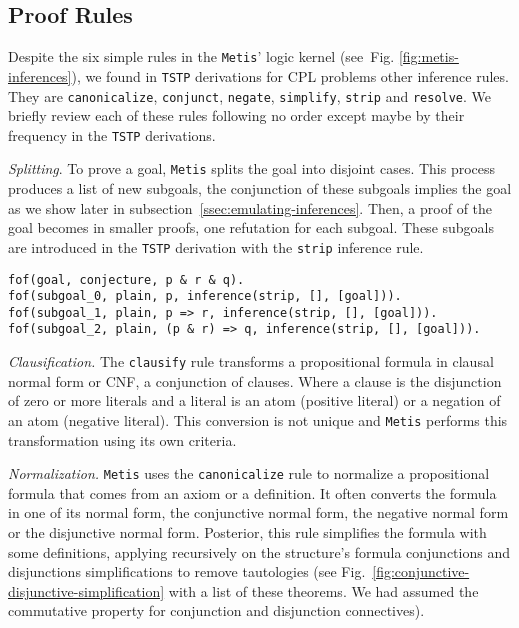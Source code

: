 \documentclass[../main.tex]{subfiles}
\begin{document}

\subsection{Proof Rules}
\label{ssec:proof-rules}

Despite the six simple rules in the \verb!Metis!' logic
kernel (see~Fig. \ref{fig:metis-inferences}), we found in \verb!TSTP!
derivations for CPL problems other inference rules.
They are \verb!canonicalize!, \verb!conjunct!, \verb!negate!, \verb!simplify!,
\verb!strip! and \verb!resolve!. We briefly review each of these rules
following no order except maybe by their frequency in the \verb!TSTP! derivations.


\textit{Splitting}.
To prove a goal, \verb!Metis! splits the goal into disjoint cases. This
process produces a list of new subgoals, the conjunction of these subgoals
implies the goal as we show later in subsection~\ref{ssec:emulating-inferences}.
Then, a proof of the goal becomes in smaller proofs, one
refutation for each subgoal. These subgoals are introduced in the \verb!TSTP!
derivation with the \verb!strip! inference rule.

\begin{verbatim}
fof(goal, conjecture, p & r & q).
fof(subgoal_0, plain, p, inference(strip, [], [goal])).
fof(subgoal_1, plain, p => r, inference(strip, [], [goal])).
fof(subgoal_2, plain, (p & r) => q, inference(strip, [], [goal])).
\end{verbatim}


\textit{Clausification.} The \verb!clausify! rule transforms a
propositional formula in clausal normal form or CNF,
a conjunction of clauses. Where a clause is the disjunction of zero or
more literals and a literal is an atom (positive literal) or a negation of an
atom (negative literal). This conversion is not unique and \verb!Metis! performs
this transformation using its own criteria.


\textit{Normalization.}
\verb!Metis! uses the \verb!canonicalize! rule to normalize a
propositional formula that comes from an axiom or a definition.
It often converts the formula in one of its normal form,
the conjunctive normal form,%
the negative normal form or the disjunctive normal form.
Posterior, this rule simplifies the formula with some definitions, applying
recursively on the structure's formula conjunctions and disjunctions simplifications
to remove tautologies
(see Fig.~\ref{fig:conjunctive-disjunctive-simplification} with a list
of these theorems. We had assumed the commutative property for conjunction and
disjunction connectives).
\end{document}
